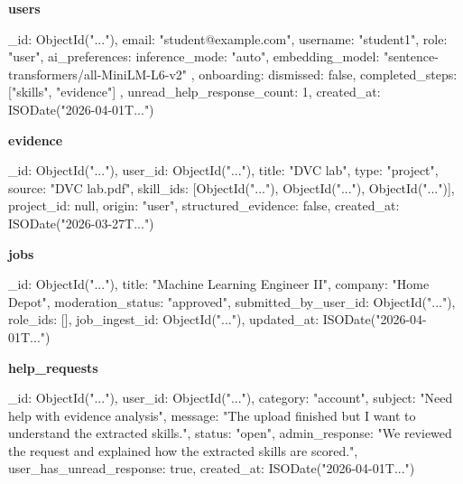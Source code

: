\documentclass[11pt]{article}
\begin{document}
\noindent
\textbf{users}
\begin{TerminalBlock}
{
  _id: ObjectId("..."),
  email: "student@example.com",
  username: "student1",
  role: "user",
  ai_preferences: {
    inference_mode: "auto",
    embedding_model: "sentence-transformers/all-MiniLM-L6-v2"
  },
  onboarding: {
    dismissed: false,
    completed_steps: ["skills", "evidence"]
  },
  unread_help_response_count: 1,
  created_at: ISODate("2026-04-01T...")
}
\end{TerminalBlock}

\noindent
\textbf{evidence}
\begin{TerminalBlock}
{
  _id: ObjectId("..."),
  user_id: ObjectId("..."),
  title: "DVC lab",
  type: "project",
  source: "DVC lab.pdf",
  skill_ids: [ObjectId("..."), ObjectId("..."), ObjectId("...")],
  project_id: null,
  origin: "user",
  structured_evidence: false,
  created_at: ISODate("2026-03-27T...")
}
\end{TerminalBlock}

\noindent
\textbf{jobs}
\begin{TerminalBlock}
{
  _id: ObjectId("..."),
  title: "Machine Learning Engineer II",
  company: "Home Depot",
  moderation_status: "approved",
  submitted_by_user_id: ObjectId("..."),
  role_ids: [],
  job_ingest_id: ObjectId("..."),
  updated_at: ISODate("2026-04-01T...")
}
\end{TerminalBlock}

\noindent
\textbf{help\_requests}
\begin{TerminalBlock}
{
  _id: ObjectId("..."),
  user_id: ObjectId("..."),
  category: "account",
  subject: "Need help with evidence analysis",
  message: "The upload finished but I want to understand the extracted skills.",
  status: "open",
  admin_response: "We reviewed the request and explained how the extracted skills are scored.",
  user_has_unread_response: true,
  created_at: ISODate("2026-04-01T...")
}
\end{TerminalBlock}
\end{document}
